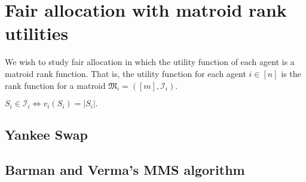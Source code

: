 \chapter{Fair allocation with matroid rank utilities}
We wish to study fair allocation in which the utility function of each agent is a matroid rank function. That is, the utility function for each agent $i \in [n]$ is the rank function for a matroid $\mathfrak{M}_i = ([m], \mathcal{I}_i)$.

$S_i \in \mathcal{I}_i \iff v_i(S_i) = |S_i|.$

\skelpars[2]

\section{Yankee Swap}
\skelpars[12]

\section{Barman and Verma's MMS algorithm}
\skelpars[9]